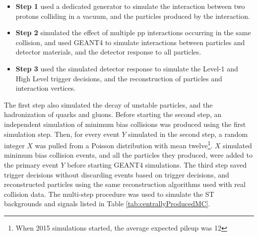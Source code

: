 \begin{itemize}
	\item \textbf{Step 1} used a dedicated \MC generator to simulate the interaction between two protons 
		colliding in a vacuum, and the particles produced by the interaction.
	\item \textbf{Step 2} simulated the effect of multiple pp interactions occurring in the same collision, 
		and used GEANT4 \cite{geant4} to simulate interactions between particles and detector materials, 
		and the detector response to all particles.
	\item \textbf{Step 3} used the simulated detector response to simulate the Level-1 and High Level 
		trigger decisions, and the reconstruction of particles and interaction vertices.
\end{itemize}

The first step also simulated the decay of unstable particles, and the hadronization of quarks and gluons.  
Before starting the second step, an independent \MC simulation of minimum bias collisions was produced 
using the first simulation step.  Then, for every event $Y$ simulated in the second step, a random integer $X$ 
was pulled from a Poisson distribution with mean twelve\footnote{When 2015 \MC simulations started, the 
average expected pileup was 12}.  $X$ simulated minimum bias collision events, and all 
the particles they produced, were added to the primary event $Y$ before starting GEANT4 simulations.  The 
third step saved trigger decisions without discarding events based on trigger decisions, and reconstructed 
particles using the same reconstruction algorithms used with real collision data.  The multi-step procedure 
was used to simulate the ST backgrounds and \WR signals listed in Table \ref{tab:centrallyProducedMC}.

